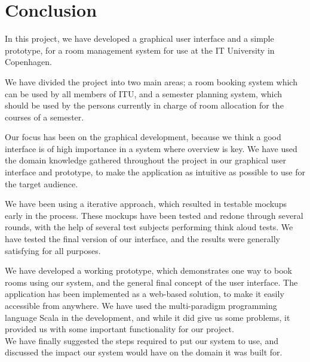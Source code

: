 \chapter{Conclusion}
In this project, we have developed a graphical user interface and a simple prototype, for a room management system for use at the IT University in Copenhagen.

We have divided the project into two main areas; a room booking system which can be used by all members of ITU, and a semester planning system, which should be used by the persons currently in charge of room allocation for the courses of a semester.

Our focus has been on the graphical development, because we think a good interface is of high importance in a system where overview is key. We have used the domain knowledge gathered throughout the project in our graphical user interface and prototype, to make the application as intuitive as possible to use for the target audience. 

We have been using a iterative approach, which resulted in testable mockups early in the process. These mockups have been tested and redone through several rounds, with the help of several test subjects performing think aloud tests. We have tested the final version of our interface, and the results were generally satisfying for all purposes.

We have developed a working prototype, which demonstrates one way to book rooms using our system, and the general final concept of the user interface. The application has been implemented as a web-based solution, to make it easily accessible from anywhere. We have used the multi-paradigm programming language Scala in the development, and while it did give us some problems, it provided us with some important functionality for our project.\\

We have finally suggested the steps required to put our system to use, and discussed the impact our system would have on the domain it was built for.